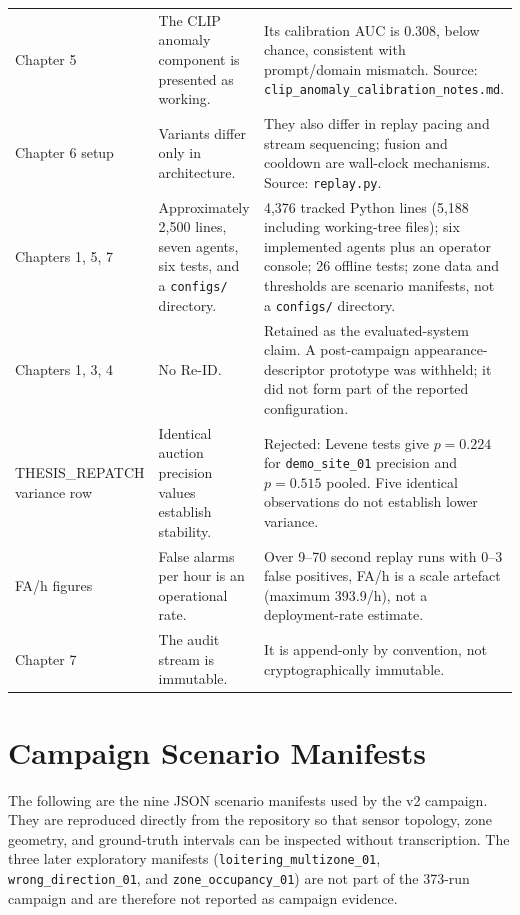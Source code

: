 \begin{longtable}{p{2.7cm}p{3.4cm}p{4.7cm}}
Chapter 5 & The CLIP anomaly component is presented as working. & Its calibration AUC is 0.308, below chance, consistent with prompt/domain mismatch. Source: \texttt{clip\_anomaly\_calibration\_notes.md}. \\
Chapter 6 setup & Variants differ only in architecture. & They also differ in replay pacing and stream sequencing; fusion and cooldown are wall-clock mechanisms. Source: \texttt{replay.py}. \\
Chapters 1, 5, 7 & Approximately 2,500 lines, seven agents, six tests, and a \texttt{configs/} directory. & 4,376 tracked Python lines (5,188 including working-tree files); six implemented agents plus an operator console; 26 offline tests; zone data and thresholds are scenario manifests, not a \texttt{configs/} directory. \\
Chapters 1, 3, 4 & No Re-ID. & Retained as the evaluated-system claim. A post-campaign appearance-descriptor prototype was withheld; it did not form part of the reported configuration. \\
THESIS\_REPATCH variance row & Identical auction precision values establish stability. & Rejected: Levene tests give $p=0.224$ for \texttt{demo\_site\_01} precision and $p=0.515$ pooled. Five identical observations do not establish lower variance. \\
FA/h figures & False alarms per hour is an operational rate. & Over 9--70 second replay runs with 0--3 false positives, FA/h is a scale artefact (maximum 393.9/h), not a deployment-rate estimate. \\
Chapter 7 & The audit stream is immutable. & It is append-only by convention, not cryptographically immutable. \\
\bottomrule
\end{longtable}
\normalsize

\chapter{Campaign Scenario Manifests}
\label{app:scenarios}

The following are the nine JSON scenario manifests used by the v2 campaign.
They are reproduced directly from the repository so that sensor topology, zone
geometry, and ground-truth intervals can be inspected without transcription.
The three later exploratory manifests (\texttt{loitering\_multizone\_01},
\texttt{wrong\_direction\_01}, and \texttt{zone\_occupancy\_01}) are not part
of the 373-run campaign and are therefore not reported as campaign evidence.

